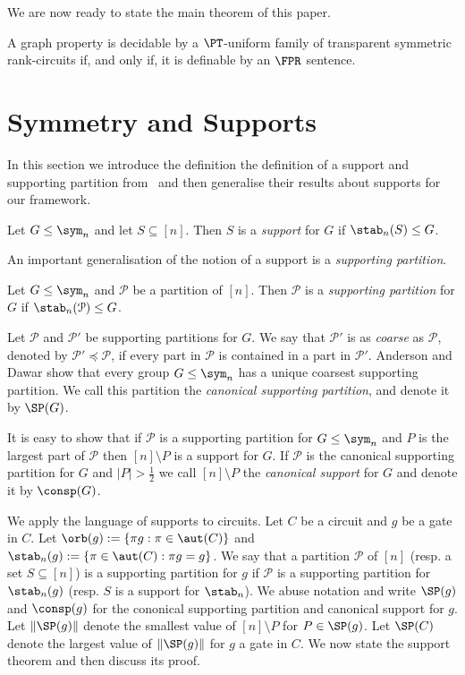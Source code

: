 \documentclass[a4paper,UKenglish]{lipics-v2018}
\begin{document}
We are now ready to state the main theorem of this paper.

\begin{theorem}
  A graph property is decidable by a $\PT$-uniform family of transparent
  symmetric rank-circuits if, and only if, it is definable by an $\FPR$
  sentence.
\end{theorem}


\section{Symmetry and Supports}
In this section we introduce the definition the definition of a support and
supporting partition from~\cite{AndersonD17} and then generalise their results
about supports for our framework.

\begin{definition}
  Let $G \leq \sym_n$ and let $S \subseteq [n]$. Then $S$ is a \emph{support}
  for $G$ if $\stab_n(S) \leq G$.
\end{definition}

An important generalisation of the notion of a support is a \emph{supporting
  partition}.

\begin{definition}
  Let $G \leq \sym_n$ and $\mathcal{P}$ be a partition of $[n]$. Then
  $\mathcal{P}$ is a \emph{supporting partition} for $G$ if
  $\stab_n(\mathcal{P}) \leq G$.
\end{definition}

Let $\mathcal{P}$ and $\mathcal{P}'$ be supporting partitions for $G$. We say
that $\mathcal{P}'$ is as \emph{coarse} as $\mathcal{P}$, denoted by
$\mathcal{P}' \preceq \mathcal{P}$, if every part in $\mathcal{P}$ is contained
in a part in $\mathcal{P}'$. Anderson and Dawar show that every group $G \leq
\sym_n$ has a unique coarsest supporting partition. We call this partition the
\emph{canonical supporting partition}, and denote it by $\SP (G)$.

It is easy to show that if $\mathcal{P}$ is a supporting partition for $G \leq
\sym_n$ and $P$ is the largest part of $\mathcal{P}$ then $[n] \setminus P$ is a
support for $G$. If $\mathcal{P}$ is the canonical supporting partition for $G$
and $\vert P \vert > \frac{1}{2}$ we call $[n] \setminus P$ the \emph{canonical
  support} for $G$ and denote it by $\consp(G)$.

We apply the language of supports to circuits. Let $C$ be a circuit and $g$ be a
gate in $C$. Let $\orb(g) := \{\pi g : \pi \in \aut(C)\}$ and $\stab_n (g) := \{
\pi \in \aut(C) : \pi g = g \}$. We say that a partition $\mathcal{P}$ of $[n]$
(resp. a set $S \subseteq [n]$) is a supporting partition for $g$ if
$\mathcal{P}$ is a supporting partition for $\stab_n(g)$ (resp. $S$ is a support
for $\stab_n$). We abuse notation and write $\SP(g)$ and $\consp(g)$ for the
cononical supporting partition and canonical support for $g$. Let $\| \SP(g) \|$
denote the smallest value of $[n] \setminus P$ for $P \in \SP(g)$. Let $\SP(C)$
denote the largest value of $\| \SP(g) \|$ for $g$ a gate in $C$. We now state
the support theorem and then discuss its proof.
\end{document}
